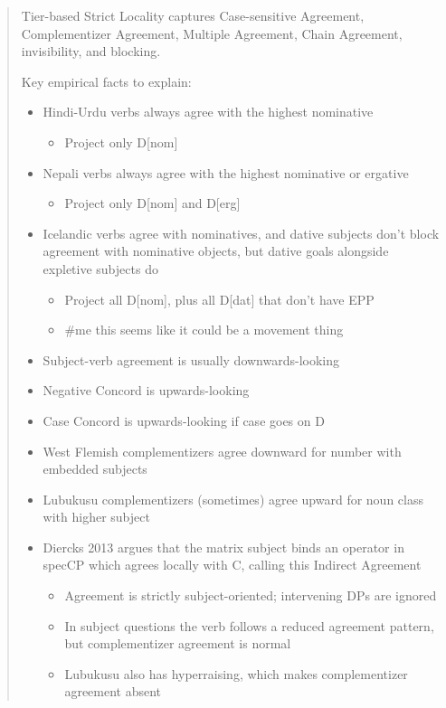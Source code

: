 
\begin{abstract}
Tier-based Strict Locality captures Case-sensitive Agreement, Complementizer Agreement, Multiple Agreement, Chain Agreement, invisibility, and blocking.

Key empirical facts to explain:

\begin{itemize}
  \item Hindi-Urdu verbs always agree with the highest nominative
  \begin{itemize}
    \item Project only D[nom]
  \end{itemize}
  \item Nepali verbs always agree with the highest nominative or ergative
  \begin{itemize}
    \item Project only D[nom] and D[erg]
  \end{itemize}
  \item Icelandic verbs agree with nominatives, and dative subjects don’t block agreement with nominative objects, but dative goals alongside expletive subjects do
  \begin{itemize}
    \item Project all D[nom], plus all D[dat] that don’t have EPP
    \item \#me this seems like it could be a movement thing
  \end{itemize}
  \item Subject-verb agreement is usually downwards-looking
  \item Negative Concord is upwards-looking
  \item Case Concord is upwards-looking if case goes on D
  \item West Flemish complementizers agree downward for number with embedded subjects
  \item Lubukusu complementizers (sometimes) agree upward for noun class with higher subject
  \item Diercks 2013 argues that the matrix subject binds an operator in specCP which agrees locally with C, calling this Indirect Agreement
  \begin{itemize}
    \item Agreement is strictly subject-oriented; intervening DPs are ignored
    \item In subject questions the verb follows a reduced agreement pattern, but complementizer agreement is normal
    \item Lubukusu also has hyperraising, which makes complementizer agreement absent
  \end{itemize}
\end{itemize}


\end{abstract}

